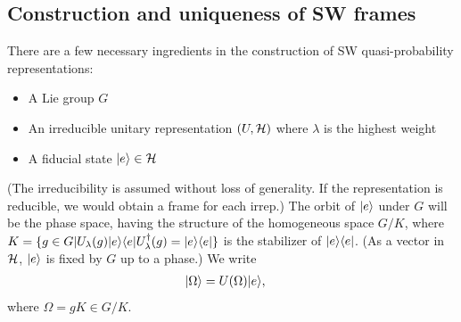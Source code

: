 
\subsection{Construction and uniqueness of SW frames}\label{ch3:construction}

There are a few necessary ingredients in the construction of SW quasi-probability representations: 
\begin{itemize}
	\item A Lie group $G$
	\item An irreducible unitary representation $(U,\mathcal{H})$ where $\lambda$ is the highest weight
	\item A fiducial state ${\left\vert{e}\right\rangle} \in \mathcal{H}$
\end{itemize}
(The irreducibility is assumed without loss of generality. If the representation is reducible, we would obtain a frame for each irrep.) The orbit of ${\left\vert{e}\right\rangle}$ under $G$ will be the phase space, having the structure of the homogeneous space $G/K$, where $K = \{ g \in G | U_{\lambda}(g){\left\vert{e}\right\rangle}{\left\langle{e}\right\vert}U^{\dagger}_{\lambda}(g) = {\left\vert{e}\right\rangle}{\left\langle{e}\right\vert} \}$ is the stabilizer of ${\left\vert{e}\right\rangle}{\left\langle{e}\right\vert}$. (As a vector in $\mathcal{H}$, ${\left\vert{e}\right\rangle}$ is fixed by $G$ up to a phase.) We write
\begin{align}
	{\left\vert{\Omega}\right\rangle} &= U(\Omega){\left\vert{e}\right\rangle},
\end{align}
where $\Omega = gK \in G/K$.

